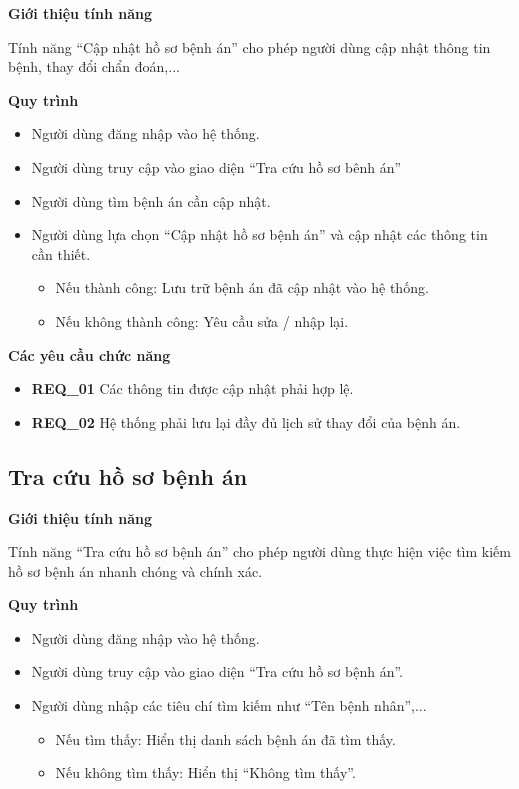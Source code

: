\noindent \textbf{Giới thiệu tính năng}

Tính năng ``Cập nhật hồ sơ bệnh án'' cho phép người dùng cập nhật thông tin bệnh, thay đổi chẩn đoán,...

\noindent \textbf{Quy trình}
\begin{itemize}
  \item Người dùng đăng nhập vào hệ thống.
  \item Người dùng truy cập vào giao diện ``Tra cứu hồ sơ bênh án''
  \item Người dùng tìm bệnh án cần cập nhật.
  \item Người dùng lựa chọn ``Cập nhật hồ sơ bệnh án'' và cập nhật các thông tin cần thiết.
    \begin{itemize}
      \item Nếu thành công: Lưu trữ bệnh án đã cập nhật vào hệ thống.
      \item Nếu không thành công: Yêu cầu sửa / nhập lại.
    \end{itemize}
\end{itemize}

\noindent \textbf{Các yêu cầu chức năng}
\begin{itemize}
  \item \textbf{REQ\_01} Các thông tin được cập nhật phải hợp lệ.
  \item \textbf{REQ\_02} Hệ thống phải lưu lại đầy đủ lịch sử thay đổi của bệnh án.
\end{itemize}

\subsection{Tra cứu hồ sơ bệnh án}

\noindent \textbf{Giới thiệu tính năng}

Tính năng ``Tra cứu hồ sơ bệnh án'' cho phép người dùng thực hiện việc tìm kiếm hồ sơ bệnh án nhanh chóng và chính xác.

\noindent \textbf{Quy trình}
\begin{itemize}
  \item Người dùng đăng nhập vào hệ thống.
  \item Người dùng truy cập vào giao diện ``Tra cứu hồ sơ bệnh án''.
  \item Người dùng nhập các tiêu chí tìm kiếm như ``Tên bệnh nhân'',...
    \begin{itemize}
      \item Nếu tìm thấy: Hiển thị danh sách bệnh án đã tìm thấy.
      \item Nếu không tìm thấy: Hiển thị ``Không tìm thấy''.
    \end{itemize}
\end{itemize}

